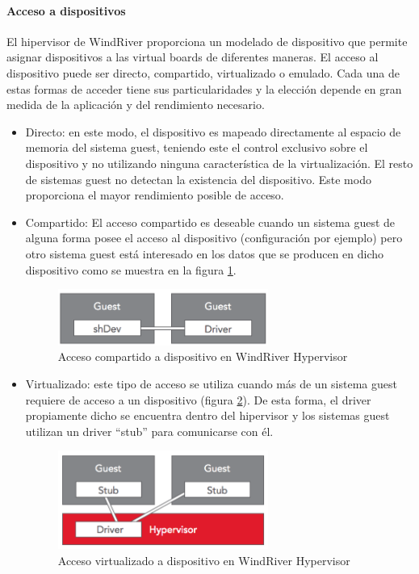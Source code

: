 \paragraph{Acceso a dispositivos}
El hipervisor de WindRiver proporciona un modelado de dispositivo que permite asignar dispositivos a las virtual boards de diferentes maneras. El acceso al dispositivo puede ser directo, compartido, virtualizado o emulado. Cada una de estas formas de acceder tiene sus particularidades y la elección depende en gran medida de la aplicación y del rendimiento necesario.

\begin{itemize}
  \item Directo: en este modo, el dispositivo es mapeado directamente al espacio de memoria del sistema guest, teniendo este el control exclusivo sobre el dispositivo y no utilizando ninguna característica de la virtualización. El resto de sistemas guest no detectan la existencia del dispositivo. Este modo proporciona el mayor rendimiento posible de acceso.

  \item Compartido: El acceso compartido es deseable cuando un sistema guest de alguna forma posee el acceso al dispositivo (configuración por ejemplo) pero otro sistema guest está interesado en los datos que se producen en dicho dispositivo como se muestra en la figura \ref{fig:windriver_drv_1}.
  \begin{figure}[!htb]
  	\centering
  	\includegraphics[width=0.65\textwidth]{recursos/windriver_drv_1.png}
  	\caption{Acceso compartido a dispositivo en WindRiver Hypervisor}
  	\label{fig:windriver_drv_1}
  \end{figure}

  \item Virtualizado: este tipo de acceso se utiliza cuando más de un sistema guest requiere de acceso a un dispositivo (figura \ref{fig:windriver_drv_2}). De esta forma, el driver propiamente dicho se encuentra dentro del hipervisor y los sistemas guest utilizan un driver ``stub'' para comunicarse con él.
  \begin{figure}[!htb]
  	\centering
  	\includegraphics[width=0.65\textwidth]{recursos/windriver_drv_2.png}
  	\caption{Acceso virtualizado a dispositivo en WindRiver Hypervisor}
  	\label{fig:windriver_drv_2}
  \end{figure}


\end{itemize}
